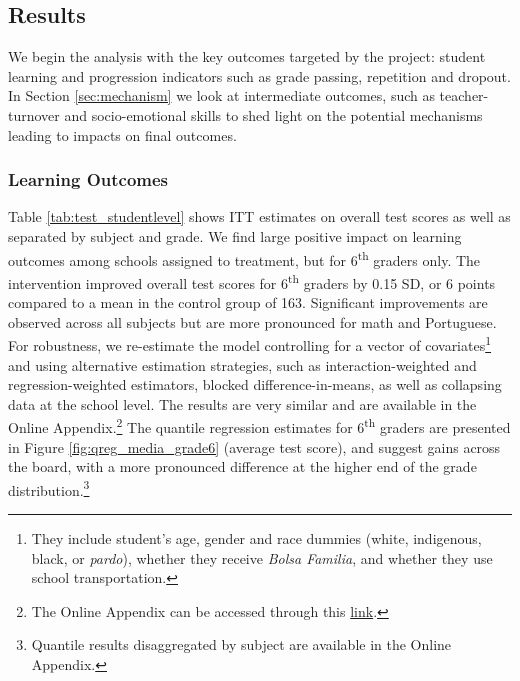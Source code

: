 \documentclass[11pt,a4paper]{article}
\begin{document}
\subsection{Results} \label{sec:results}
We begin the analysis with the key outcomes targeted by the project: student learning and progression indicators such as grade passing, repetition and dropout. In Section \ref{sec:mechanism} we look at intermediate outcomes, such as teacher-turnover and socio-emotional skills to shed light on the potential mechanisms leading to impacts on final outcomes.

\subsubsection*{Learning Outcomes} \label{sec:skills}

Table \ref{tab:test_studentlevel} shows ITT estimates on overall test scores as well as separated by subject and grade. We find large positive impact on learning outcomes among schools assigned to treatment, but for 6\textsuperscript{th} graders only. The intervention improved overall test scores for 6\textsuperscript{th} graders by 0.15 SD, or 6 points compared to a mean in the control group of 163. Significant improvements are observed across all subjects but are more pronounced for math and Portuguese. For robustness, we re-estimate the model controlling for a vector of covariates\footnote{They include student's age, gender and race dummies (white, indigenous, black, or \textit{pardo}), whether they receive \textit{Bolsa Familia}, and whether they use school transportation.} and using alternative estimation strategies, such as interaction-weighted and regression-weighted estimators, blocked difference-in-means, as well as collapsing data at the school level. The results are very similar and are available in the Online Appendix.\footnote{The Online Appendix can be accessed through this \href{https://github.com/worldbank/brazil-pip-education/blob/master/pip_app.pdf}{link}.} The quantile regression estimates for 6\textsuperscript{th} graders are presented in Figure \ref{fig:qreg_media_grade6} (average test score), and suggest gains across the board, with a more pronounced difference at the higher end of the grade distribution.\footnote{Quantile results disaggregated by subject are available in the Online Appendix.}
\end{document}

